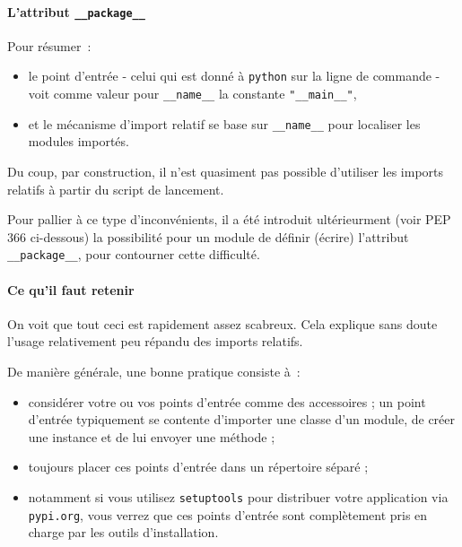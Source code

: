     \hypertarget{lattribut-__package__}{%
\paragraph{\texorpdfstring{L'attribut
\texttt{\_\_package\_\_}}{L'attribut \_\_package\_\_}}\label{lattribut-__package__}}

    Pour résumer~:

\begin{itemize}
\tightlist
\item
  le point d'entrée - celui qui est donné à \texttt{python} sur la ligne
  de commande - voit comme valeur pour \texttt{\_\_name\_\_} la
  constante \texttt{"\_\_main\_\_"},
\item
  et le mécanisme d'import relatif se base sur \texttt{\_\_name\_\_}
  pour localiser les modules importés.
\end{itemize}

    Du coup, par construction, il n'est quasiment pas possible d'utiliser
les imports relatifs à partir du script de lancement.

Pour pallier à ce type d'inconvénients, il a été introduit ultérieurment
(voir PEP 366 ci-dessous) la possibilité pour un module de définir
(écrire) l'attribut \texttt{\_\_package\_\_}, pour contourner cette
difficulté.

    \hypertarget{ce-quil-faut-retenir}{%
\paragraph{Ce qu'il faut retenir}\label{ce-quil-faut-retenir}}

    On voit que tout ceci est rapidement assez scabreux. Cela explique sans
doute l'usage relativement peu répandu des imports relatifs.

De manière générale, une bonne pratique consiste à~:

\begin{itemize}
\tightlist
\item
  considérer votre ou vos points d'entrée comme des accessoires ; un
  point d'entrée typiquement se contente d'importer une classe d'un
  module, de créer une instance et de lui envoyer une méthode ;
\item
  toujours placer ces points d'entrée dans un répertoire séparé ;
\item
  notamment si vous utilisez \texttt{setuptools} pour distribuer votre
  application via \texttt{pypi.org}, vous verrez que ces points d'entrée
  sont complètement pris en charge par les outils d'installation.
\end{itemize}

